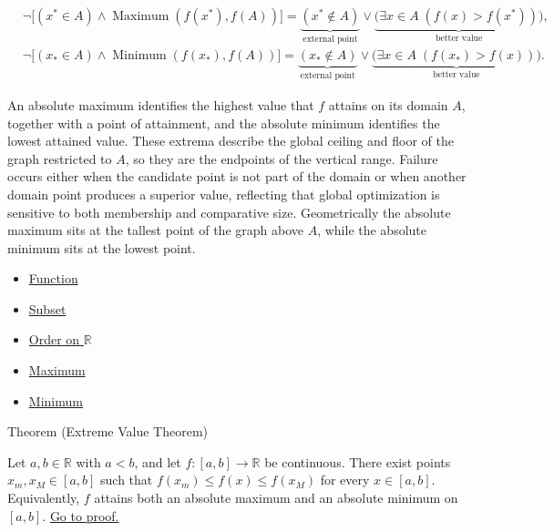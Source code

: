 \begin{remark*}
\[
\begin{aligned}
&\neg\bigl[(x^{*} \in A) \land \operatorname{Maximum}(f(x^{*}), f(A))\bigr]
= \underbrace{(x^{*} \notin A)}_{\text{external point}}
\lor
\underbrace{\bigl(\exists x \in A\; (f(x) > f(x^{*}))\bigr)}_{\text{better value}},\\
&\neg\bigl[(x_{*} \in A) \land \operatorname{Minimum}(f(x_{*}), f(A))\bigr]
= \underbrace{(x_{*} \notin A)}_{\text{external point}}
\lor
\underbrace{\bigl(\exists x \in A\; (f(x_{*}) > f(x))\bigr)}_{\text{better value}}.
\end{aligned}
\]
\end{remark*}





\begin{remark*}[Interpretation]
An absolute maximum identifies the highest value that $f$ attains on its domain $A$, together with a point of attainment, and the absolute minimum identifies the lowest attained value. These extrema describe the global ceiling and floor of the graph restricted to $A$, so they are the endpoints of the vertical range. Failure occurs either when the candidate point is not part of the domain or when another domain point produces a superior value, reflecting that global optimization is sensitive to both membership and comparative size. Geometrically the absolute maximum sits at the tallest point of the graph above $A$, while the absolute minimum sits at the lowest point.
\end{remark*}

\begin{dependencies}
\begin{itemize}
  \item \hyperref[def:function]{Function}
  \item \hyperref[def:subset]{Subset}
  \item \hyperref[def:order-on-r]{Order on $\mathbb{R}$}
  \item \hyperref[def:maximum]{Maximum}
  \item \hyperref[def:minimum]{Minimum}
\end{itemize}
\end{dependencies}

\begin{theorembox}{Theorem (Extreme Value Theorem)}
\begin{theorem}
\label{thm:extreme-value-theorem}
Let $a,b \in \mathbb{R}$ with $a<b$, and let $f:[a,b] \to \mathbb{R}$ be continuous. There exist points $x_m,x_M \in [a,b]$ such that $f(x_m) \le f(x) \le f(x_M)$ for every $x \in [a,b]$. Equivalently, $f$ attains both an absolute maximum and an absolute minimum on $[a,b]$.
\hyperref[prf:extreme-value-theorem]{Go to proof.}
\end{theorem}
\end{theorembox}


